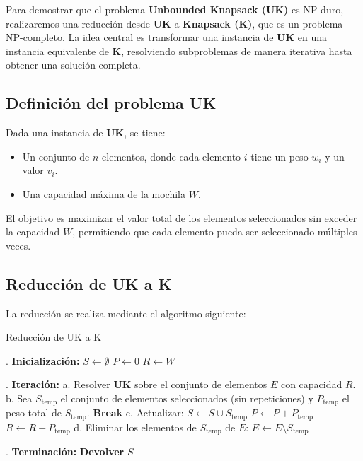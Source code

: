 \documentclass{report}
\begin{document}
Para demostrar que el problema \textbf{Unbounded Knapsack (UK)} es NP-duro, realizaremos una reducción desde \textbf{UK} a \textbf{Knapsack (K)}, que es un problema NP-completo. La idea central es transformar una instancia de \textbf{UK} en una instancia equivalente de \textbf{K}, resolviendo subproblemas de manera iterativa hasta obtener una solución completa.

\subsection*{Definición del problema UK}

Dada una instancia de \textbf{UK}, se tiene:
\begin{itemize}
	\item Un conjunto de \( n \) elementos, donde cada elemento \( i \) tiene un peso \( w_i \) y un valor \( v_i \).
	\item Una capacidad máxima de la mochila \( W \).
\end{itemize}

El objetivo es maximizar el valor total de los elementos seleccionados sin exceder la capacidad \( W \), permitiendo que cada elemento pueda ser seleccionado múltiples veces.

\subsection*{Reducción de UK a K}

La reducción se realiza mediante el algoritmo siguiente:


\begin{algorithm}[H]
	\label{uk_to_k}\caption{Reducción de UK a K}

	\State
	. \textbf{Inicialización:}
	\State \quad \( S \gets \emptyset \)  
	\State \quad \( P \gets 0 \)          
	\State \quad \( R \gets W \)          
	
	\State
	. \textbf{Iteración:}
	\State \quad a. Resolver \textbf{UK} sobre el conjunto de elementos \( E \) con capacidad \( R \).
	\State \quad b. Sea \( S_{\text{temp}} \) el conjunto de elementos seleccionados (sin repeticiones) y \( P_{\text{temp}} \) el peso total de \( S_{\text{temp}} \).
	\State \quad \quad \textbf{Break}  
	\EndIf
	\State \quad c. Actualizar:
	\State \quad \quad \( S \gets S \cup S_{\text{temp}} \)
	\State \quad \quad \( P \gets P + P_{\text{temp}} \)
	\State \quad \quad \( R \gets R - P_{\text{temp}} \)
	\State \quad d. Eliminar los elementos de \( S_{\text{temp}} \) de \( E \): \( E \gets E \setminus S_{\text{temp}} \)
	\EndWhile
	
	\State
	. \textbf{Terminación:}
	\State \quad \textbf{Devolver} \( S \)  
\end{algorithm}
\end{document}
